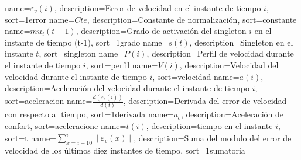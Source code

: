 {
  name={\ensuremath{\varepsilon_v(i)}},
  description={Error de velocidad en el instante de tiempo $i$},
  sort=1error
}
{
  name={\ensuremath{Cte}},
  description={Constante de normalización},
  sort=constante
}
{
  name={\ensuremath{mu_{i}(t-1)}},
  description={Grado de activación del singleton $i$ en el instante de tiempo (t-1)},
  sort=1grado
}
{
  name={\ensuremath{s(t)}},
  description={Singleton en el instante $t$},
  sort=singleton
}
{
  name={\ensuremath{P(i)}},
  description={Perfil de velocidad durante el instante de tiempo $i$},
  sort=perfil
}
{
  name={\ensuremath{V(i)}},
  description={Velocidad del velocidad durante el instante de tiempo $i$},
  sort=velocidad
}
{
  name={\ensuremath{a(i)}},
  description={Aceleración del velocidad durante el instante de tiempo $i$},
  sort=aceleracion
}
{
  name={\ensuremath{\frac{d(\varepsilon_v(i))}{d(t)}}},
  description={Derivada del error de velocidad con respecto al tiempo},
  sort=1derivada
}
{
  name={\ensuremath{a_c}},
  description={Aceleración de confort},
  sort=aceleracionc
}
{
  name={\ensuremath{t(i)}},
  description={tiempo en el instante $i$},
  sort=t
}
{
  name={\ensuremath{\sum_{x= i-10}^{i}\mid\varepsilon_v(x)\mid}},
  description={Suma del modulo del error de velocidad de los últimos diez instantes de tiempo},
  sort=1sumatoria
}

